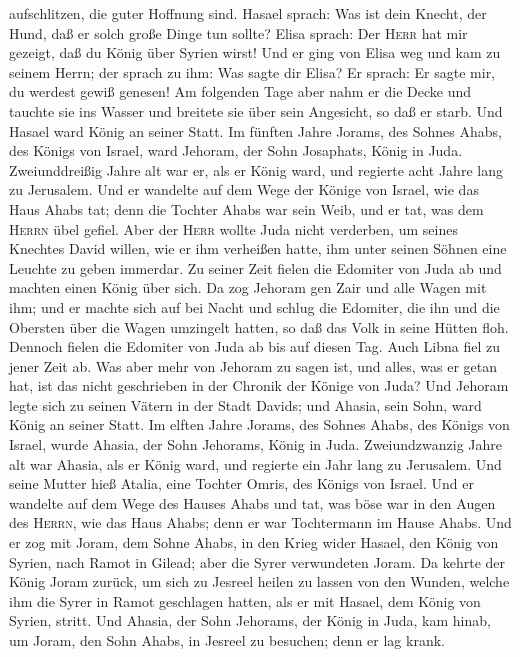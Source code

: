 aufschlitzen, die guter Hoffnung sind.  Hasael sprach:
Was ist dein Knecht, der Hund, daß er solch große Dinge tun sollte?
Elisa sprach: Der \textsc{Herr} hat mir gezeigt, daß du König über
Syrien wirst!  Und er ging von Elisa weg und kam zu
seinem Herrn; der sprach zu ihm: Was sagte dir Elisa? Er sprach: Er
sagte mir, du werdest gewiß genesen!  Am folgenden Tage
aber nahm er die Decke und tauchte sie ins Wasser und breitete sie über
sein Angesicht, so daß er starb. Und Hasael ward König an seiner Statt.
 Im fünften Jahre Jorams, des Sohnes Ahabs, des Königs
von Israel, ward Jehoram, der Sohn Josaphats, König in Juda.
 Zweiunddreißig Jahre alt war er, als er König ward, und
regierte acht Jahre lang zu Jerusalem.  Und er wandelte
auf dem Wege der Könige von Israel, wie das Haus Ahabs tat; denn die
Tochter Ahabs war sein Weib, und er tat, was dem \textsc{Herrn} übel
gefiel.  Aber der \textsc{Herr} wollte Juda nicht
verderben, um seines Knechtes David willen, wie er ihm verheißen hatte,
ihm unter seinen Söhnen eine Leuchte zu geben immerdar. 
Zu seiner Zeit fielen die Edomiter von Juda ab und machten einen König
über sich.  Da zog Jehoram gen Zair und alle Wagen mit
ihm; und er machte sich auf bei Nacht und schlug die Edomiter, die ihn
und die Obersten über die Wagen umzingelt hatten, so daß das Volk in
seine Hütten floh.  Dennoch fielen die Edomiter von Juda
ab bis auf diesen Tag. Auch Libna fiel zu jener Zeit ab. 
Was aber mehr von Jehoram zu sagen ist, und alles, was er getan hat, ist
das nicht geschrieben in der Chronik der Könige von Juda?
 Und Jehoram legte sich zu seinen Vätern in der Stadt
Davids; und Ahasia, sein Sohn, ward König an seiner Statt.
 Im elften Jahre Jorams, des Sohnes Ahabs, des Königs von
Israel, wurde Ahasia, der Sohn Jehorams, König in Juda. 
Zweiundzwanzig Jahre alt war Ahasia, als er König ward, und regierte ein
Jahr lang zu Jerusalem. Und seine Mutter hieß Atalia, eine Tochter
Omris, des Königs von Israel.  Und er wandelte auf dem
Wege des Hauses Ahabs und tat, was böse war in den Augen des
\textsc{Herrn}, wie das Haus Ahabs; denn er war Tochtermann im Hause
Ahabs.  Und er zog mit Joram, dem Sohne Ahabs, in den
Krieg wider Hasael, den König von Syrien, nach Ramot in Gilead; aber die
Syrer verwundeten Joram.  Da kehrte der König Joram
zurück, um sich zu Jesreel heilen zu lassen von den Wunden, welche ihm
die Syrer in Ramot geschlagen hatten, als er mit Hasael, dem König von
Syrien, stritt. Und Ahasia, der Sohn Jehorams, der König in Juda, kam
hinab, um Joram, den Sohn Ahabs, in Jesreel zu besuchen; denn er lag
krank.

